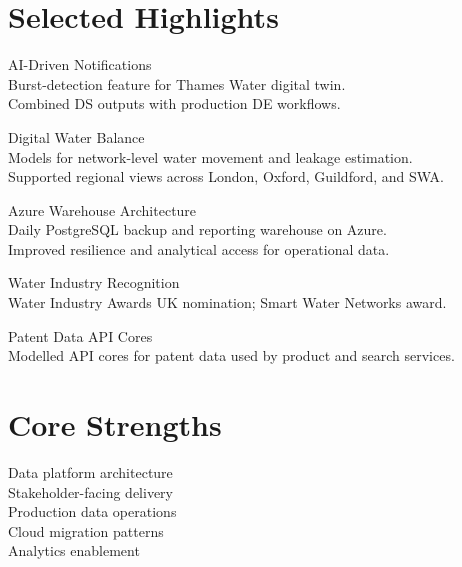 \documentclass[]{deedy-resume-openfont}
\begin{document}
\begin{minipage}[t]{0.33\textwidth}

\section{Selected Highlights}

AI-Driven Notifications \\
\textbullet{} Burst-detection feature for Thames Water digital twin. \\
\textbullet{} Combined DS outputs with production DE workflows. \\
\sectionsep

Digital Water Balance \\
\textbullet{} Models for network-level water movement and leakage estimation. \\
\textbullet{} Supported regional views across London, Oxford, Guildford, and SWA. \\
\sectionsep

Azure Warehouse Architecture \\
\textbullet{} Daily PostgreSQL backup and reporting warehouse on Azure. \\
\textbullet{} Improved resilience and analytical access for operational data. \\
\sectionsep

Water Industry Recognition \\
\textbullet{} Water Industry Awards UK nomination; Smart Water Networks award. \\
\sectionsep

Patent Data API Cores \\
\textbullet{} Modelled API cores for patent data used by product and search services. \\
\sectionsep

\section{Core Strengths}
Data platform architecture \\
Stakeholder-facing delivery \\
Production data operations \\
Cloud migration patterns \\
Analytics enablement \\
\sectionsep

%
%

\end{minipage} 
\end{document}
